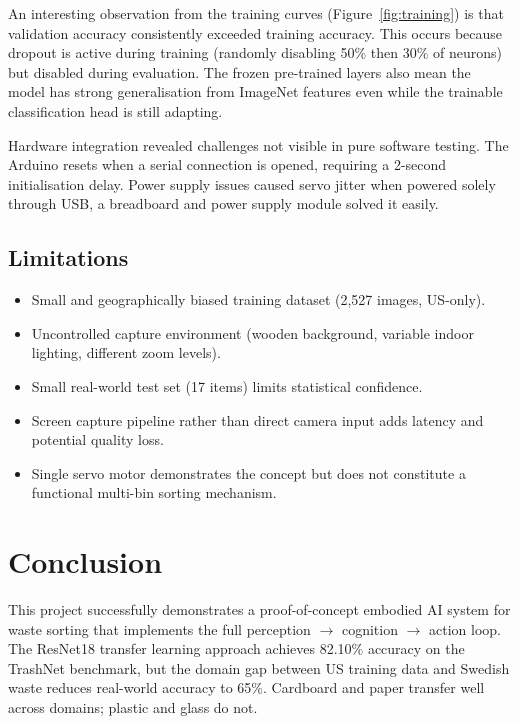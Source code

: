 \documentclass[11pt,a4paper]{article}
\begin{document}
An interesting observation from the training curves (Figure~\ref{fig:training}) is that validation accuracy consistently exceeded training accuracy. This occurs because dropout is active during training (randomly disabling 50\% then 30\% of neurons) but disabled during evaluation. The frozen pre-trained layers also mean the model has strong generalisation from ImageNet features even while the trainable classification head is still adapting.

Hardware integration revealed challenges not visible in pure software testing. The Arduino resets when a serial connection is opened, requiring a 2-second initialisation delay. Power supply issues caused servo jitter when powered solely through USB, a breadboard and power supply module solved it easily. 

\subsection{Limitations}

\begin{itemize}
  \item Small and geographically biased training dataset (2,527 images, US-only).
  \item Uncontrolled capture environment (wooden background, variable indoor lighting, different zoom levels).
  \item Small real-world test set (17 items) limits statistical confidence.
  \item Screen capture pipeline rather than direct camera input adds latency and potential quality loss.
  \item Single servo motor demonstrates the concept but does not constitute a functional multi-bin sorting mechanism.
\end{itemize}

\section{Conclusion}

This project successfully demonstrates a proof-of-concept embodied AI system for waste sorting that implements the full perception $\rightarrow$ cognition $\rightarrow$ action loop. The ResNet18 transfer learning approach achieves 82.10\% accuracy on the TrashNet benchmark, but the domain gap between US training data and Swedish waste reduces real-world accuracy to 65\%. Cardboard and paper transfer well across domains; plastic and glass do not.
\end{document}
